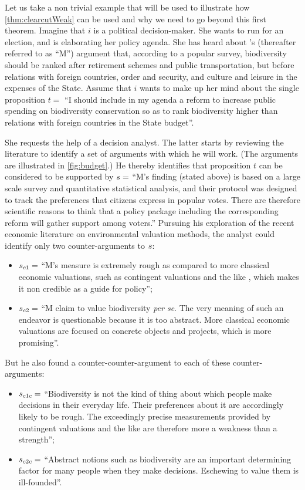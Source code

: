 \documentclass[smallextended,nospthms, natbib]{svjour3}
\begin{document}
\begin{example}
\label{ex:budget}
Let us take a non trivial example that will be used to illustrate how \cref{thm:clearcutWeak} can be used and why we need to go beyond this first theorem. Imagine that $i$ is a political decision-maker. She wants to run for an election, and is elaborating her policy agenda. She has heard about  \citeauthor{meinard_measuring_2017}'s \citeyearpar{meinard_measuring_2017} (thereafter referred to as “M”) argument that, according to a popular survey, biodiversity should be ranked after retirement schemes and public transportation, but before relations with foreign countries, order and security, and culture and leisure in the expenses of the State. Assume that $i$ wants to make up her mind about the single proposition $t =$ “I should include in my agenda a reform to increase public spending on biodiversity conservation so as to rank biodiversity higher than relations with foreign countries in the State budget”.

She requests the help of a decision analyst. The latter starts by reviewing the literature to identify a set of arguments with which he will work. (The arguments are illustrated in \cref{fig:budget}.) He thereby identifies that proposition $t$ can be considered to be supported by $s =$ “M's finding (stated above) is based on a large scale survey and quantitative statistical analysis, and their protocol was designed to track the preferences that citizens express in popular votes. There are therefore scientific reasons to think that a policy package including the corresponding reform will gather support among voters.” Pursuing his exploration of the recent economic literature on environmental valuation methods, the analyst could identify only two counter-arguments to $s$:
\begin{itemize}
	\item $s_{c1}=$ “M's measure is extremely rough as compared to more classical economic valuations, such as contingent valuations and the like \citep{kontoleon_biodiversity_2007}, which makes it non credible as a guide for policy”;
	\item $s_{c2}=$ “M claim to value biodiversity \emph{per se}. The very meaning of such an endeavor is questionable because it is too abstract. More classical economic valuations are focused on concrete objects and projects, which is more promising”.
\end{itemize}

But he also found a counter-counter-argument to each of these counter-arguments:
\begin{itemize}
	\item $s_{c1c}=$ “Biodiversity is not the kind of thing about which people make decisions in their everyday life. Their preferences about it are accordingly likely to be rough. The exceedingly precise measurements provided by contingent valuations and the like are therefore more a weakness than a strength”;
	\item $s_{c2c}=$ “Abstract notions such as biodiversity are an important determining factor for many people when they make decisions. Eschewing to value them is ill-founded”.
\end{itemize}


\end{example}
\end{document}
